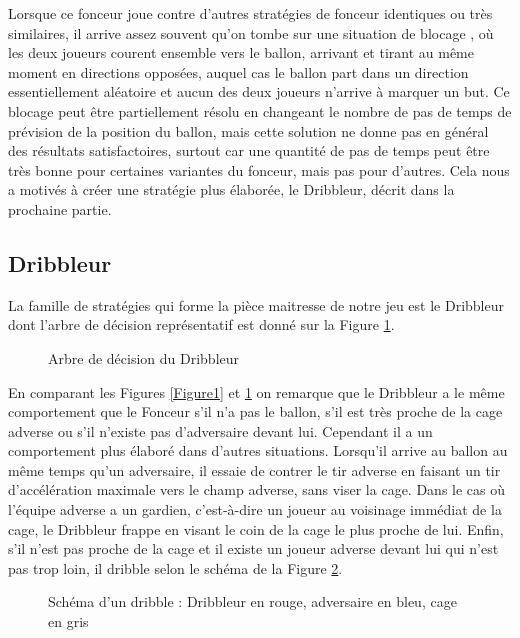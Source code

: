 \documentclass[a4paper,12pt]{article}
\begin{document}
Lorsque ce fonceur joue contre d'autres stratégies de fonceur identiques ou très similaires, il arrive assez souvent qu'on tombe sur une situation de \og blocage \fg, où les deux joueurs courent ensemble vers le ballon, arrivant et tirant au même moment en directions opposées, auquel cas le ballon part dans un direction essentiellement aléatoire et aucun des deux joueurs n'arrive à marquer un but. Ce blocage peut être partiellement résolu en changeant le nombre de pas de temps de prévision de la position du ballon, mais cette solution ne donne pas en général des résultats satisfactoires, surtout car une quantité de pas de temps peut être très bonne pour certaines variantes du fonceur, mais pas pour d'autres. Cela nous a motivés à créer une stratégie plus élaborée, le Dribbleur, décrit dans la prochaine partie.

\subsection{Dribbleur}

La famille de stratégies qui forme la pièce maitresse de notre jeu est le Dribbleur dont l'arbre de décision représentatif est donné sur la Figure \ref{Figure3}. 

\begin{figure}[ht]
\centering

\caption{Arbre de décision du Dribbleur}
\label{Figure3}
\end{figure}

En comparant les Figures \ref{Figure1} et \ref{Figure3} on remarque que le Dribbleur a le même comportement que le Fonceur s'il n'a pas le ballon, s'il est très proche de la cage adverse ou s'il n'existe pas d'adversaire devant lui. Cependant il a un comportement plus élaboré dans d'autres situations. Lorsqu'il arrive au ballon au même temps qu'un adversaire, il essaie de contrer le tir adverse en faisant un tir d'accélération maximale vers le champ adverse, sans viser la cage. Dans le cas où l’équipe adverse a un gardien, c'est-à-dire un joueur au voisinage immédiat de la cage, le Dribbleur frappe en visant le coin de la cage le plus proche de lui. Enfin, s'il n'est pas proche de la cage et il existe un joueur adverse devant lui qui n'est pas trop loin, il dribble selon le schéma de la Figure \ref{Figure4}.

\begin{figure}[ht]
\centering

\caption{Schéma d'un dribble : Dribbleur en rouge, adversaire en bleu, cage en gris}
\label{Figure4}
\end{figure}
\end{document}
